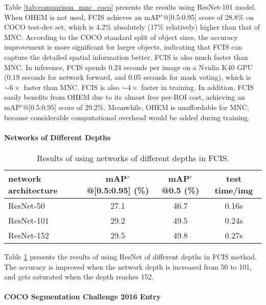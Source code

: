 \documentclass[10pt,twocolumn,letterpaper]{article}
\begin{document}
Table \ref{tab:comparison_mnc_coco} presents the results using ResNet-101 model. When OHEM is not used, FCIS achieves an mAP$^r$@[0.5:0.95] score of 28.8\% on COCO test-dev set, which is 4.2\% absolutely (17\% relatively) higher than that of MNC. According to the COCO standard split of object sizes, the accuracy improvement is more significant for larger objects, indicating that FCIS can capture the detailed spatial information better. FCIS is also much faster than MNC. In inference, FCIS spends 0.24 seconds per image on a Nvidia K40 GPU (0.19 seconds for network forward, and 0.05 seconds for mask voting), which is $\sim6 \times$ faster than MNC. FCIS is also $\sim4 \times$ faster in training. In addition, FCIS easily benefits from OHEM due to its almost free per-ROI cost, achieving an mAP$^r$@[0.5:0.95] score of 29.2\%. Meanwhile, OHEM is unaffordable for MNC, because considerable computational overhead would be added during training.

\paragraph{Networks of Different Depths}

\setlength{\tabcolsep}{4pt}
\renewcommand{\arraystretch}{1.2}
\begin{table}
\begin{center}
\small
\begin{tabular}{l|c|c|c}
\hline
\scriptsize network architecture & \scriptsize mAP$^r$@[0.5:0.95] (\%) & \scriptsize mAP$^r$@0.5 (\%) & \scriptsize test time/img\\
\hline
\hline
\footnotesize ResNet-50    & 27.1 & 46.7 & 0.16s \\
\footnotesize ResNet-101   & 29.2 & 49.5 & 0.24s \\
\footnotesize ResNet-152   & 29.5 & 49.8 & 0.27s \\
\hline
\end{tabular}
\end{center}
\caption{Results of using networks of different depths in FCIS.}
\label{tab:depth_coco}
\end{table}

Table \ref{tab:depth_coco} presents the results of using ResNet of different depths in FCIS method. The accuracy is improved when the network depth is increased from 50 to 101, and gets saturated when the depth reaches 152.

\paragraph{COCO Segmentation Challenge 2016 Entry}
\end{document}
